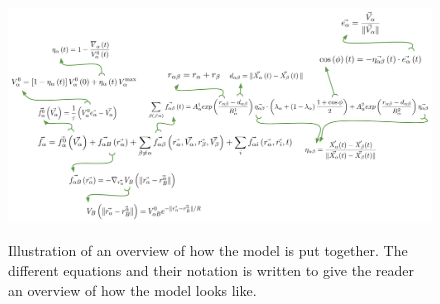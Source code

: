 \begin{figure}[hb] %
    \centering
    {\includegraphics[scale=0.35]{Figures/overview.pdf}} 
    \caption[Overview of the model]{Illustration of an overview of how the model is put together. The different equations and their notation is written to give the 
	     reader an overview of how the model looks like.}
    \label{overview}
\end{figure}

